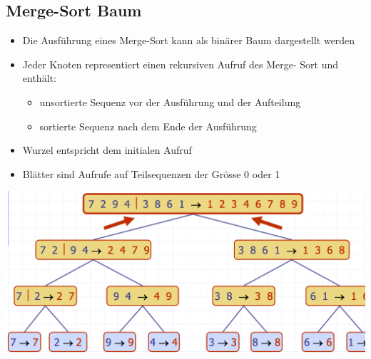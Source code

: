 \subsection{Merge-Sort Baum}
\begin{itemize}
    \item Die Ausführung eines Merge-Sort kann als binärer Baum dargestellt werden
    \item Jeder Knoten representiert einen rekursiven Aufruf des Merge- Sort und enthält:
    \begin{itemize}
        \item unsortierte Sequenz vor der Ausführung und der Aufteilung
        \item sortierte Sequenz nach dem Ende der Ausführung
    \end{itemize}
    \item Wurzel entspricht dem initialen Aufruf
    \item Blätter sind Aufrufe auf Teilsequenzen der Grösse 0 oder 1
\end{itemize}
\begin{center}
    \includegraphics[scale=.2]{graphic/04 MergeSort/merge sort.png}
\end{center}

\newpage